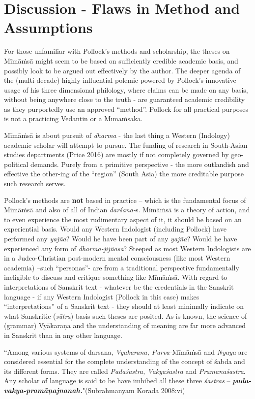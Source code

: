 \section*{Discussion - Flaws in Method and Assumptions}

For those unfamiliar with Pollock’s methods and scholarship, the theses on Mīmāṁsā might seem to be based on sufficiently credible academic basis, and possibly look to be argued out effectively by the author. The deeper agenda of the (multi-decade) highly influential polemic powered by Pollock’s innovative usage of his three dimensional philology, where claims can be made on any basis, without being anywhere close to the truth - are guaranteed academic credibility as they purportedly use an approved “method”. Pollock for all practical purposes is not a practicing Vedāntin or a Mīmāṁsaka.

Mīmāṁsā is about pursuit of \textit{dharma} - the last thing a Western (Indology) academic scholar will attempt to pursue. The funding of research in South-Asian studies departments (Price 2016) are mostly if not completely governed by geo-political demands. Purely from a primitive perspective - the more outlandish and effective the other-ing of the “region” (South Asia) the more creditable purpose such research serves. 

Pollock’s methods are \textbf{not} based in practice – which is the fundamental focus of Mīmāṁsā and also of all of Indian \textit{darśana-}s. Mīmāṁsā is a theory of action, and to even experience the most rudimentary aspect of it, it should be based on an experiential basis. Would any Western Indologist (including Pollock) have performed any \textit{yajña}? Would he have been part of any \textit{yajña}? Would he have experienced any form of \textit{dharma-jijñāsā}? Steeped as most Western Indologists are in a Judeo-Christian post-modern mental consciousness (like most Western academia) –such “personas”- are from a traditional perspective fundamentally ineligible to discuss and critique something like Mīmāṁsā. With regard to interpretations of Sanskrit text - whatever be the credentials in the Sanskrit language - if any Western Indologist (Pollock in this case) makes “interpretations” of a Sanskrit text - they should at least minimally indicate on what Sanskritic (\textit{sūtra}) basis such theses are posited. As is known, the science of (grammar) Vyākaraṇa and the understanding of meaning are far more advanced in Sanskrit than in any other language.

\begin{myquote}
“Among various systems of darsana, \textit{Vyakarana, Purva-}Mīmāṁsā and \textit{Nyaya} are considered essential for the complete understanding of the concept of śabda and its different forms. They are called \textit{Padaśastra, Vakyaśastra} and \textit{Pramanaśastra}. Any scholar of language is said to be have imbibed all these three \textit{śastras} – \textit{\textbf{pada-vakya-pramāṇajnanah.}}"\hfill (Subrahmanyam Korada 2008:vi)
\end{myquote}

